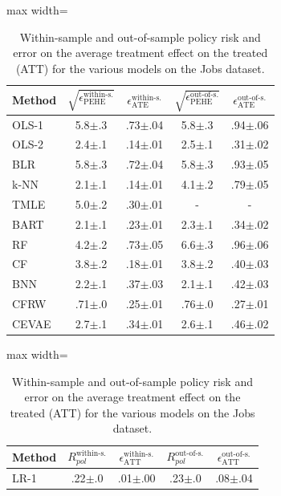 \begin{table}[htb!]
\begin{minipage}{.51\linewidth}
\centering
\caption{Within-sample and out-of-sample mean and standard errors for the metrics for the various models at the IHDP dataset.}\label{tab:ihdp}
\begin{adjustbox}{max width=\linewidth}
\begin{tabular}{lcccc}
\toprule
Method & $\sqrt{\epsilon^{\text{within-s.}}_\text{PEHE}}$ & $\epsilon^{\text{within-s.}}_{\text{ATE}}$ & $\sqrt{\epsilon^{\text{out-of-s.}}_\text{PEHE}}$  & $\epsilon^{\text{out-of-s.}}_{\text{ATE}}$ \\\midrule
OLS-1 & 5.8$\pm$.3 & .73$\pm$.04 & 5.8$\pm$.3 & .94$\pm$.06\\
OLS-2 & 2.4$\pm$.1 & .14$\pm$.01 & 2.5$\pm$.1 & .31$\pm$.02\\
BLR & 5.8$\pm$.3 & .72$\pm$.04 & 5.8$\pm$.3 & .93$\pm$.05 \\
k-NN & 2.1$\pm$.1 & .14$\pm$.01 & 4.1$\pm$.2 & .79$\pm$.05\\
TMLE & 5.0$\pm$.2 & .30$\pm$.01 & - & - \\
BART & 2.1$\pm$.1 & .23$\pm$.01 & 2.3$\pm$.1 & .34$\pm$.02 \\
RF & 4.2$\pm$.2 & .73$\pm$.05 & 6.6$\pm$.3 & .96$\pm$.06 \\
CF & 3.8$\pm$.2 & .18$\pm$.01 & 3.8$\pm$.2 & .40$\pm$.03 \\
BNN & 2.2$\pm$.1 & .37$\pm$.03 & 2.1$\pm$.1 & .42$\pm$.03 \\
CFRW & .71$\pm$.0 & .25$\pm$.01 & .76$\pm$.0 & .27$\pm$.01\\\midrule
CEVAE & 2.7$\pm$.1 & .34$\pm$.01& 2.6$\pm$.1 & .46$\pm$.02\\
\bottomrule
\end{tabular}%
\end{adjustbox}
\end{minipage}\hfill
\begin{minipage}{.45\linewidth}
\centering
\caption{Within-sample and out-of-sample policy risk and error on the average
treatment effect on the treated (ATT) for the various models on the Jobs dataset.}\label{tab:jobs}
\begin{adjustbox}{max width=\linewidth}
\begin{tabular}{lcccc}
\toprule
Method & $R^{\text{within-s.}}_{pol}$ & $\epsilon^{\text{within-s.}}_{\text{ATT}}$ & $R^{\text{out-of-s.}}_{pol}$ & $\epsilon^{\text{out-of-s.}}_{\text{ATT}}$\\\midrule
LR-1 & .22$\pm$.0 & .01$\pm$.00 & .23$\pm$.0 & .08$\pm$.04\\

\end{tabular}
\end{adjustbox}
\end{minipage}
\end{table}
